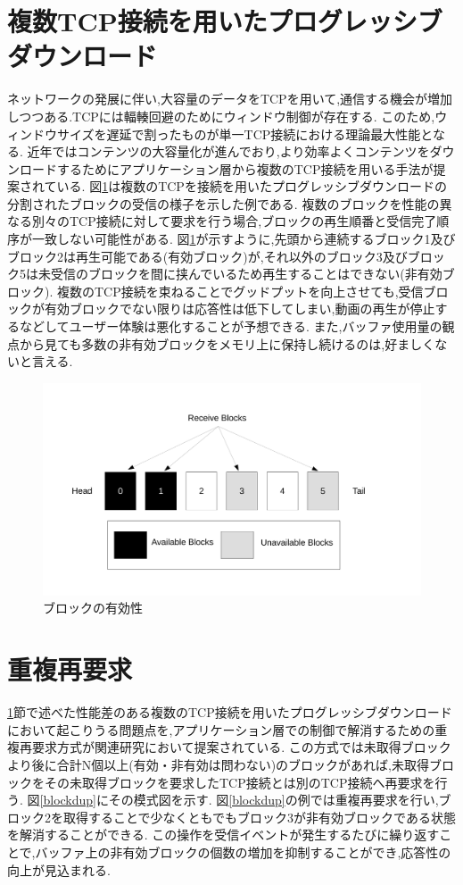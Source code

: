 \documentclass[a4j,12pt]{gradthesis_utf8}
\begin{document}
\clearpage

\section{複数TCP接続を用いたプログレッシブダウンロード}
\label{hukusu}
ネットワークの発展に伴い,大容量のデータをTCPを用いて,通信する機会が増加しつつある.TCPには輻輳回避のためにウィンドウ制御が存在する.
このため,ウィンドウサイズを遅延で割ったものが単一TCP接続における理論最大性能となる.
近年ではコンテンツの大容量化が進んでおり,より効率よくコンテンツをダウンロードするためにアプリケーション層から複数のTCP接続を用いる手法が提案されている.
図\ref{block}は複数のTCPを接続を用いたプログレッシブダウンロードの分割されたブロックの受信の様子を示した例である.
複数のブロックを性能の異なる別々のTCP接続に対して要求を行う場合,ブロックの再生順番と受信完了順序が一致しない可能性がある.
図\ref{block}が示すように,先頭から連続するブロック1及びブロック2は再生可能である(有効ブロック)が,それ以外のブロック3及びブロック5は未受信のブロックを間に挟んでいるため再生することはできない(非有効ブロック).
複数のTCP接続を束ねることでグッドプットを向上させても,受信ブロックが有効ブロックでない限りは応答性は低下してしまい,動画の再生が停止するなどしてユーザー体験は悪化することが予想できる.
また,バッファ使用量の観点から見ても多数の非有効ブロックをメモリ上に保持し続けるのは,好ましくないと言える.

\begin{figure}[h]
	\centering
	\includegraphics[width=17cm]{figure/block.pdf}
	\caption{ブロックの有効性}
	\label{block}
\end{figure}

 \section{重複再要求}
 \label{juhuku}
 \ref{hukusu}節で述べた性能差のある複数のTCP接続を用いたプログレッシブダウンロードにおいて起こりうる問題点を,アプリケーション層での制御で解消するための重複再要求方式が関連研究\cite{proxy}において提案されている.
 この方式では未取得ブロックより後に合計N個以上(有効・非有効は問わない)のブロックがあれば,未取得ブロックをその未取得ブロックを要求したTCP接続とは別のTCP接続へ再要求を行う.
 図\ref{blockdup}にその模式図を示す.
 図\ref{blockdup}の例では重複再要求を行い,ブロック2を取得することで少なくともでもブロック3が非有効ブロックである状態を解消することができる.
 この操作を受信イベントが発生するたびに繰り返すことで,バッファ上の非有効ブロックの個数の増加を抑制することができ,応答性の向上が見込まれる.
 
\end{document}
